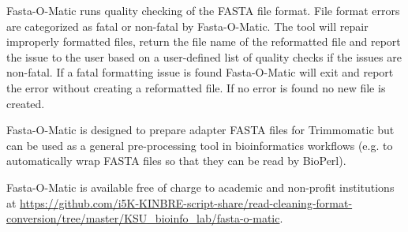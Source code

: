 Fasta-O-Matic runs quality checking of the FASTA file format. File format errors are categorized as fatal or non-fatal by Fasta-O-Matic. The tool will repair improperly formatted files, return the file name of the reformatted file and report the issue to the user based on a user-defined list of quality checks if the issues are non-fatal. If a fatal formatting issue is found Fasta-O-Matic will exit and report the error without creating a reformatted file. If no error is found no new file is created.

Fasta-O-Matic is designed to prepare adapter FASTA files for Trimmomatic but can be used as a general pre-processing tool in bioinformatics workflows (e.g. to automatically wrap FASTA files so that they can be read by BioPerl).

Fasta-O-Matic is available free of charge to academic and non-profit institutions at \url{https://github.com/i5K-KINBRE-script-share/read-cleaning-format-conversion/tree/master/KSU\_bioinfo\_lab/fasta-o-matic}.
  